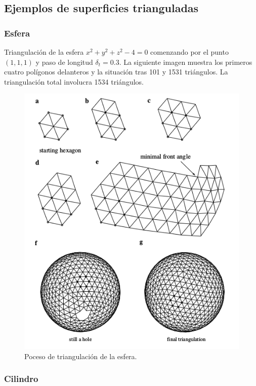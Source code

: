 \subsection{Ejemplos de superficies trianguladas}

\subsubsection{Esfera}

Triangulación de la esfera $x^2 + y^2 + z^2 - 4 = 0$ comenzando por el punto $(1,1,1)$ y paso de longitud $\delta_t = 0.3$. La siguiente imagen muestra los primeros cuatro polígonos delanteros y la situación tras 101 y 1531 triángulos. La triangulación total involucra 1534 triángulos.
\[\]
\begin{figure}[h]
\centering
\includegraphics[scale=0.7]{images/hartmann6.png}
\caption{Poceso de triangulación de la esfera.}
\end{figure}

\newpage
\subsubsection{Cilindro}

